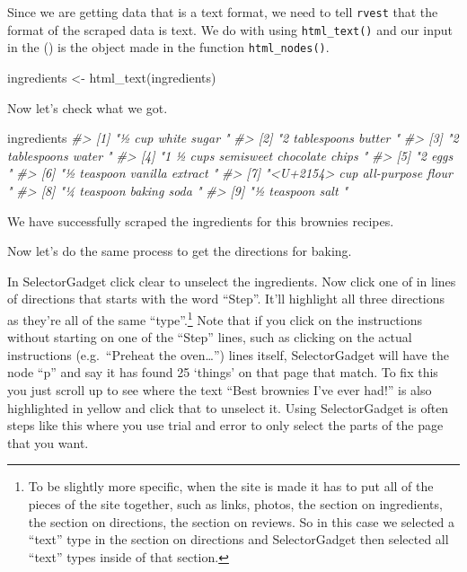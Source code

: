 \documentclass[
]{krantz}
\makeatletter
\newenvironment{Shaded}{\begin{snugshade}}{\end{snugshade}}
\newcommand{\CommentTok}[1]{\textcolor[rgb]{0.37,0.37,0.37}{\textit{#1}}}
\newcommand{\FunctionTok}[1]{\textcolor[rgb]{0,0,0}{#1}}
\newcommand{\NormalTok}[1]{#1}
\newcommand{\OtherTok}[1]{\textcolor[rgb]{0.37,0.37,0.37}{#1}}
\newenvironment{kframe}{%
\medskip{}
\setlength{\fboxsep}{.8em}
 \def\at@end@of@kframe{}%
 \ifinner\ifhmode%
  \def\at@end@of@kframe{\end{minipage}}%
  \begin{minipage}{\columnwidth}%
 \fi\fi%
 \def\FrameCommand##1{\hskip\@totalleftmargin \hskip-\fboxsep
 \colorbox{shadecolor}{##1}\hskip-\fboxsep
     \hskip-\linewidth \hskip-\@totalleftmargin \hskip\columnwidth}%
 \MakeFramed {\advance\hsize-\width
   \@totalleftmargin\z@ \linewidth\hsize
   \@setminipage}}%
 {\par\unskip\endMakeFramed%
 \at@end@of@kframe}
\renewenvironment{Shaded}{\begin{kframe}}{\end{kframe}}
\makeatother
\begin{document}
Since we are getting data that is a text format, we need to tell \texttt{rvest} that the format of the scraped data is text. We do with using \texttt{html\_text()} and our input in the () is the object made in the function \texttt{html\_nodes()}.

\begin{Shaded}
\begin{Highlighting}[]
\NormalTok{ingredients }\OtherTok{\textless{}{-}} \FunctionTok{html\_text}\NormalTok{(ingredients)}
\end{Highlighting}
\end{Shaded}

Now let's check what we got.

\begin{Shaded}
\begin{Highlighting}[]
\NormalTok{ingredients}
\CommentTok{\#\textgreater{} [1] "½ cup white sugar "                 }
\CommentTok{\#\textgreater{} [2] "2 tablespoons butter "              }
\CommentTok{\#\textgreater{} [3] "2 tablespoons water "               }
\CommentTok{\#\textgreater{} [4] "1 ½ cups semisweet chocolate chips "}
\CommentTok{\#\textgreater{} [5] "2 eggs "                            }
\CommentTok{\#\textgreater{} [6] "½ teaspoon vanilla extract "        }
\CommentTok{\#\textgreater{} [7] "\textless{}U+2154\textgreater{} cup all{-}purpose flour "    }
\CommentTok{\#\textgreater{} [8] "¼ teaspoon baking soda "            }
\CommentTok{\#\textgreater{} [9] "½ teaspoon salt "}
\end{Highlighting}
\end{Shaded}

We have successfully scraped the ingredients for this brownies recipes.

Now let's do the same process to get the directions for baking.

In SelectorGadget click clear to unselect the ingredients. Now click one of in lines of directions that starts with the word ``Step''. It'll highlight all three directions as they're all of the same ``type''.\footnote{To be slightly more specific, when the site is made it has to put all of the pieces of the site together, such as links, photos, the section on ingredients, the section on directions, the section on reviews. So in this case we selected a ``text'' type in the section on directions and SelectorGadget then selected all ``text'' types inside of that section.} Note that if you click on the instructions without starting on one of the ``Step'' lines, such as clicking on the actual instructions (e.g.~``Preheat the oven\ldots{}'') lines itself, SelectorGadget will have the node ``p'' and say it has found 25 `things' on that page that match. To fix this you just scroll up to see where the text ``Best brownies I've ever had!'' is also highlighted in yellow and click that to unselect it. Using SelectorGadget is often steps like this where you use trial and error to only select the parts of the page that you want.
\end{document}
